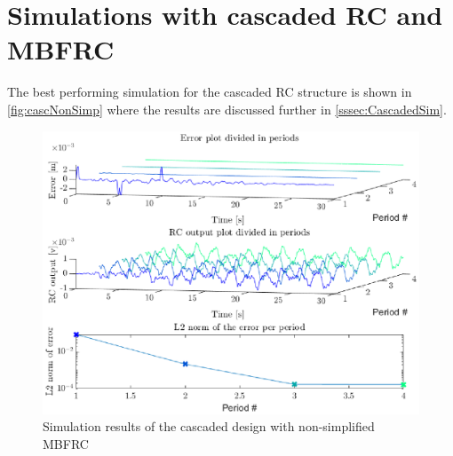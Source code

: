 \documentclass[journal]{IEEEtran}
\begin{document}
\section{Simulations with cascaded RC and MBFRC}\label{app:simCasc}
The best performing simulation for the cascaded RC structure is shown in \autoref{fig:cascNonSimp} where the results are discussed further in \autoref{sssec:CascadedSim}.

\begin{figure}
    \centering
    \includegraphics[width=1\linewidth]{figures/nonSimple_RC_MBFRC/SimCascNon.eps}
    \caption{Simulation results of the cascaded design with non-simplified MBFRC}
    \label{fig:cascNonSimp}
\end{figure}



% 


% 

\end{document}
